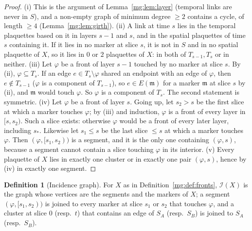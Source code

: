 \documentclass[11pt,a4paper]{article}
\theoremstyle{definition}
\newtheorem{definition}[theorem]{Definition}
\theoremstyle{remark}
\begin{document}
\begin{proof}
(i) This is the argument of Lemma~\ref{mg:lem:layer} (temporal links are never in $S$), and a non-empty graph of minimum degree $\ge2$ contains a
cycle, of length $\ge4$ (Lemma~\ref{mg:lem:girth}).
(ii) A link at time $s$ lies in the temporal plaquettes based on it in layers $s-1$ and $s$, and in the spatial plaquettes of time $s$ containing it.
If it lies in no marker at slice $s$, it is not in $S$ and in no spatial plaquette of $X$, so it lies in $0$ or $2$ plaquettes of $X$: in both of
$T_{s-1},T_s$ or in neither.
(iii) Let $\varphi$ be a front of layer $s-1$ touched by no marker at slice $s$. By (ii), $\varphi\subseteq T_s$. If an edge $e\in T_s\setminus\varphi$ shared
an endpoint with an edge of $\varphi$, then $e\notin T_{s-1}$ ($\varphi$ is a component of $T_{s-1}$), so $e\in E(\mathfrak m)$ for a marker $\mathfrak m$ at
slice $s$ by (ii), and $\mathfrak m$ would touch $\varphi$. So $\varphi$ is a component of $T_s$. The second statement is symmetric.
(iv) Let $\varphi$ be a front of layer $s$. Going up, let $s_2>s$ be the first slice at which a marker touches $\varphi$; by (iii) and induction, $\varphi$ is
a front of every layer in $[s,s_2)$. Such a slice exists: otherwise $\varphi$ would be a front of every later layer, including $s_*$. Likewise let
$s_1\le s$ be the last slice $\le s$ at which a marker touches $\varphi$. Then $(\varphi,[s_1,s_2))$ is a segment, and it is the only one containing
$(\varphi,s)$, because a segment cannot contain a slice touching $\varphi$ in its interior.
(v) Every plaquette of $X$ lies in exactly one cluster or in exactly one pair $(\varphi,s)$, hence by (iv) in exactly one segment.
\end{proof}

\begin{definition}[Incidence graph]\label{mg:def:incidence}
For $X$ as in Definition~\ref{mg:def:fronts}, $\mathcal I(X)$ is the graph whose vertices are the segments and the markers of $X$; a segment
$(\varphi,[s_1,s_2))$ is joined to every marker at slice $s_1$ or $s_2$ that touches $\varphi$, and a cluster at slice $0$ (resp.\ $t$) that contains an
edge of $S_A$ (resp.\ $S_B$) is joined to $S_A$ (resp.\ $S_B$).
\end{definition}
\end{document}
